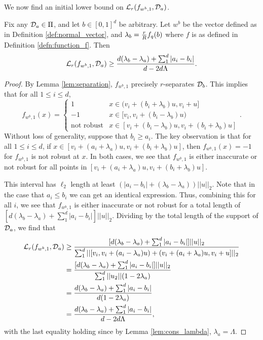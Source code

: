 We now find an initial lower bound on $\mathcal L_r(f_{w^b, 1}, {\mathcal D}_a)$.

\begin{lem}\label{lem:loss_bound_general}
Fix any ${\mathcal D}_a \in \Pi$, and let $b \in [0,1]^d$ be arbitrary. Let $w^b$ be the vector defined as in Definition \ref{def:normal_vector}, and $\lambda_b = \frac{r}{R}f_q(b)$ where $f$ is as defined in Definition \ref{defn:function_f}. Then $$\mathcal L_r(f_{w^b, 1}, {\mathcal D}_a) \geq \frac{d(\lambda_b - \lambda_a) + \sum_1^d|a_i - b_i|}{d - 2d\Lambda}.$$ 
\end{lem}

\begin{proof}
By Lemma \ref{lem:separation}, $f_{w^b, 1}$ precisely $r$-separates ${\mathcal D}_b$. This implies that for all $1 \leq i \leq d$,
$$f_{w^b, 1}(x) = \begin{cases} 1 & x \in (v_i + (b_i + \lambda_b)u, v_i + u] \\-1 & x \in [v_i, v_i + (b_i - \lambda_b)u) \\ \text{not robust} & x \in [v_i + (b_i - \lambda_b)u, v_i + (b_i + \lambda_b)u] \end{cases}.$$ Without loss of generality, suppose that $b_i \geq a_i$. The key observation is that for all $1 \leq i \leq d$, if $x \in [v_i + (a_i + \lambda_a)u, v_i + (b_i + \lambda_b)u]$, then $f_{w^b, 1}(x) = -1$ for $f_{w^b, 1}$ is not robust at $x$. In both cases, we see that $f_{w^b, 1}$ is either inaccurate or not robust for all points in $[v_i + (a_i + \lambda_a)u, v_i + (b_i + \lambda_b)u]$. 

This interval has $\ell_2$ length at least $(|a_i - b_i| + (\lambda_b - \lambda_a))||u||_2$. Note that in the case that $a_i \leq b_i$ we can get an identical expression. Thus,  combining this for all $i$, we see that $f_{w^b, 1}$ is either inaccurate or not robust for a total length of $[d(\lambda_b - \lambda_a) + \sum_1^d |a_i - b_i|]||u||_2$. Dividing by the total length of the support of ${\mathcal D}_a$, we find that
\begin{equation*}
\begin{split}
\mathcal L_r(f_{w^b, 1}, {\mathcal D}_a) &\geq \frac{[d(\lambda_b - \lambda_a) + \sum_1^d |a_i - b_i|]||u||_2}{\sum_1^d ||[v_i, v_i + (a_i - \lambda_a)u) + (v_i + (a_i + \lambda_a)u, v_i + u]||_2} \\
&= \frac{[d(\lambda_b - \lambda_a) + \sum_1^d |a_i - b_i|]||u||_2}{\sum_1^d ||u_2||(1 - 2\lambda_a)} \\
&= \frac{d(\lambda_b - \lambda_a) + \sum_1^d |a_i - b_i|}{d(1 - 2\lambda_a)} \\
&= \frac{d(\lambda_b - \lambda_a) + \sum_1^d |a_i - b_i|}{d - 2d\Lambda},
\end{split}
\end{equation*}
with the last equality holding since by Lemma \ref{lem:cons_lambda}, $\lambda_a = \Lambda$. 
\end{proof}

